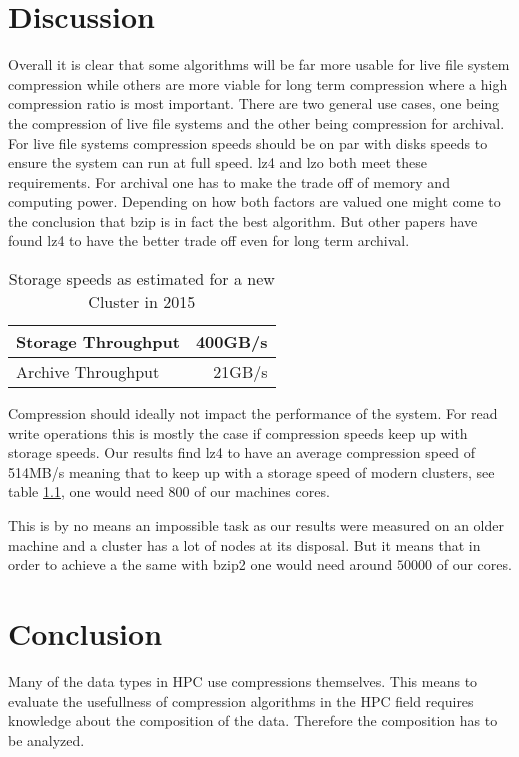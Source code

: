 \documentclass[
	12pt,
	a4paper,
	BCOR10mm,
	DIV14,
	listof=totoc,
	bibliography=totoc,
	headsepline
]{scrreprt}
\begin{document}
\chapter{Discussion}
\label{Discussion}
Overall it is clear that some algorithms will be far more usable for live file system compression while others are more viable for long term compression where a high compression ratio is most important.
There are two general use cases, one being the compression of live file systems and the other being compression for archival.
For live file systems compression speeds should be on par with disks speeds to ensure the system can run at full speed.
lz4 and lzo both meet these requirements.
For archival one has to make the trade off of memory and computing power. Depending on how both factors are valued one might come to the conclusion that bzip is in fact the best algorithm. But other papers have found lz4 to have the better trade off even for long term archival. %

\begin{table}
\begin{center}
\begin{tabular}{|l|r|}
    \hline
    Storage Throughput & 400GB/s \\
    \hline
    Archive Throughput &  21GB/s \\
    \hline
\end{tabular}
\caption{Storage speeds as estimated for a new Cluster in 2015 \cite{ExaStoSy}}
\label{tab:storage_speeds}
\end{center}
\end{table}

Compression should ideally not impact the performance of the system. 
For read write operations this is mostly the case if compression speeds keep up with storage speeds.
Our results find lz4 to have an average compression speed of 514MB/s meaning that to keep up with a storage speed of modern clusters, see table \ref{tab:storage_speeds}, one would need 800 of our machines cores. 

This is by no means an impossible task as our results were measured on an older machine and a cluster has a lot of nodes at its disposal. But it means that in order to achieve a the same with bzip2 one would need around $50000$ of our cores.

\chapter{Conclusion}
\label{Conclusion}
Many of the data types in HPC use compressions themselves.
This means to evaluate the usefullness of compression algorithms in the HPC field requires knowledge about the composition of the data.
Therefore the composition has to be analyzed.
\\
\end{document}
